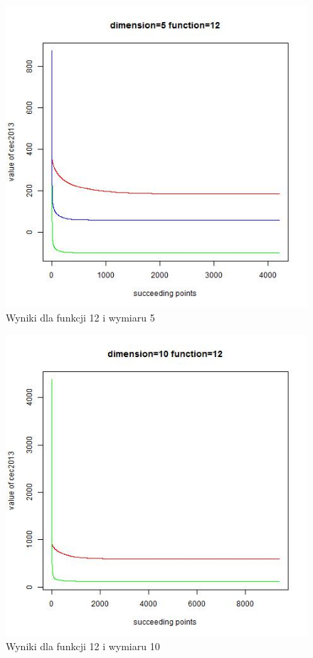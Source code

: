 \documentclass{article}
\begin{document}
\begin{figure}[H]
\centering
\includegraphics[scale=0.6]{dim_5__func_12}
\caption{Wyniki dla funkcji 12 i wymiaru 5}
\end{figure}

\begin{figure}[H]
\centering
\includegraphics[scale=0.6]{dim_10__func_12}
\caption{Wyniki dla funkcji 12 i wymiaru 10}
\end{figure}
\end{document}
